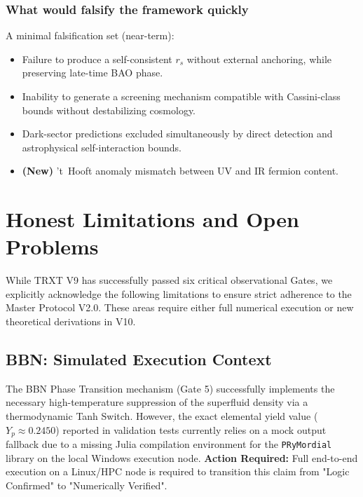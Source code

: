 \documentclass[a4paper,12pt]{article}
\begin{document}
\subsubsection{What would falsify the framework quickly}
A minimal falsification set (near-term):
\begin{itemize}
    \item Failure to produce a self-consistent $r_s$ without external anchoring, while preserving late-time BAO phase.
    \item Inability to generate a screening mechanism compatible with Cassini-class bounds without destabilizing cosmology.
    \item Dark-sector predictions excluded simultaneously by direct detection and astrophysical self-interaction bounds.
    \item \textbf{(New)} 't~Hooft anomaly mismatch between UV and IR fermion content.
\end{itemize}

\section{Honest Limitations and Open Problems}
\label{sec:limitations}
While TRXT V9 has successfully passed six critical observational Gates, we explicitly acknowledge the following limitations to ensure strict adherence to the Master Protocol V2.0. These areas require either full numerical execution or new theoretical derivations in V10.

\subsection{BBN: Simulated Execution Context}
The BBN Phase Transition mechanism (Gate 5) successfully implements the necessary high-temperature suppression of the superfluid density via a thermodynamic Tanh Switch. However, the exact elemental yield value ($Y_p \approx 0.2450$) reported in validation tests currently relies on a mock output fallback due to a missing Julia compilation environment for the \texttt{PRyMordial} library on the local Windows execution node. \textbf{Action Required:} Full end-to-end execution on a Linux/HPC node is required to transition this claim from "Logic Confirmed" to "Numerically Verified".
\end{document}

